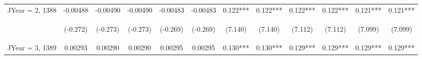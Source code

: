 \documentclass[]{article}
\begin{document}
\begin{center}
\begin{tabular}{lccccccccccc}
JYear = 2, 1388 & -0.00488 & -0.00490 & -0.00490 & -0.00483 & -0.00483 & 0.122*** & 0.122*** & 0.122*** & 0.122*** & 0.121*** & 0.121*** \\
\vspace{4pt} & \begin{footnotesize}(-0.272)\end{footnotesize} & \begin{footnotesize}(-0.273)\end{footnotesize} & \begin{footnotesize}(-0.273)\end{footnotesize} & \begin{footnotesize}(-0.269)\end{footnotesize} & \begin{footnotesize}(-0.269)\end{footnotesize} & \begin{footnotesize}(7.140)\end{footnotesize} & \begin{footnotesize}(7.140)\end{footnotesize} & \begin{footnotesize}(7.112)\end{footnotesize} & \begin{footnotesize}(7.112)\end{footnotesize} & \begin{footnotesize}(7.099)\end{footnotesize} & \begin{footnotesize}(7.099)\end{footnotesize} \\
JYear = 3, 1389 & 0.00293 & 0.00290 & 0.00290 & 0.00295 & 0.00295 & 0.130*** & 0.130*** & 0.129*** & 0.129*** & 0.129*** & 0.129*** \\

\end{tabular}
\end{center}
\end{document}
